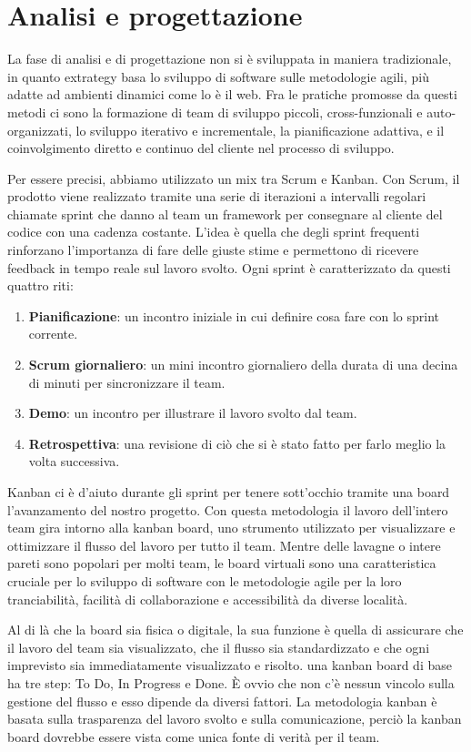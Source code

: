 \section{Analisi e progettazione}
La fase di analisi e di progettazione non si è sviluppata in maniera tradizionale, in quanto extrategy basa lo sviluppo di software sulle metodologie agili, più adatte ad ambienti dinamici come lo è il web.
Fra le pratiche promosse da questi metodi ci sono la formazione di team di sviluppo piccoli, cross-funzionali e auto-organizzati, 
lo sviluppo iterativo e incrementale, la pianificazione adattiva, e il coinvolgimento diretto e continuo del cliente nel processo di sviluppo.

Per essere precisi, abbiamo utilizzato un mix tra Scrum e Kanban.
Con Scrum\cite{scrum}, il prodotto viene realizzato tramite una serie di iterazioni a intervalli regolari chiamate sprint che danno al team un framework per consegnare al cliente del codice con una cadenza costante.
L'idea è quella che degli sprint frequenti rinforzano l'importanza di fare delle giuste stime e permettono di ricevere feedback in tempo reale sul lavoro svolto.
Ogni sprint è caratterizzato da questi quattro riti:
\begin{enumerate}
\item \textbf{Pianificazione}: un incontro iniziale in cui definire cosa fare con lo sprint corrente.
\item \textbf{Scrum giornaliero}: un mini incontro giornaliero della durata di una decina di minuti per sincronizzare il team. 
\item \textbf{Demo}: un incontro per illustrare il lavoro svolto dal team.
\item \textbf{Retrospettiva}: una revisione di ciò che si è stato fatto per farlo meglio la volta successiva.
\end{enumerate} 

Kanban\cite{kanban} ci è d'aiuto durante gli sprint per tenere sott'occhio tramite una board l'avanzamento del nostro progetto.
Con questa metodologia il lavoro dell'intero team gira intorno alla kanban board, uno strumento utilizzato per visualizzare e ottimizzare il flusso del lavoro per tutto il team.
Mentre delle lavagne o intere pareti sono popolari per molti team, le board virtuali sono una caratteristica cruciale per lo sviluppo di software con le metodologie agile per la loro tranciabilità, facilità di collaborazione e accessibilità da diverse località.

Al di là che la board sia fisica o digitale, la sua funzione è quella di assicurare che il lavoro del team sia visualizzato, che il flusso sia standardizzato e che ogni imprevisto sia immediatamente visualizzato e risolto.
una kanban board di base ha tre step: To Do, In Progress e Done.
È ovvio che non c'è nessun vincolo sulla gestione del flusso e esso dipende da diversi fattori.
La metodologia kanban è basata sulla trasparenza del lavoro svolto e sulla comunicazione,
perciò  la kanban board dovrebbe essere vista come unica fonte di verità per il team. 

